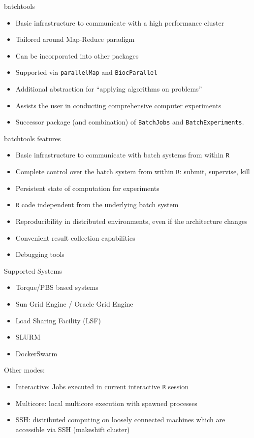\documentclass[11pt,compress,t,notes=noshow, aspectratio=169, xcolor=table]{beamer}
\begin{document}
\begin{frame}[fragile]{batchtools}
  \begin{itemize}
    \item Basic infrastructure to communicate with a high performance cluster
    \item Tailored around Map-Reduce paradigm
    \item Can be incorporated into other packages
    \item Supported via \texttt{parallelMap} and \texttt{BiocParallel}
    \item Additional abstraction for \enquote{applying algorithms on problems}
    \item Assists the user in conducting comprehensive computer experiments
    \item Successor package (and combination) of \texttt{BatchJobs} and \texttt{BatchExperiments}.
  \end{itemize}
\end{frame}

\begin{frame}[fragile]{batchtools features}
  \begin{itemize}
    \item Basic infrastructure to communicate with batch systems from within \texttt{R}
    \item Complete control over the batch system from within \texttt{R}: submit, supervise, kill
    \item Persistent state of computation for experiments
    \item \texttt{R} code independent from the underlying batch system
    \item Reproducibility in distributed environments, even if the architecture changes
    \item Convenient result collection capabilities
    \item Debugging tools
  \end{itemize}
\end{frame}

\begin{frame}[fragile]{Supported Systems}
  \begin{itemize}
    \item Torque/PBS based systems
    \item Sun Grid Engine / Oracle Grid Engine
    \item Load Sharing Facility (LSF)
    \item SLURM
    \item DockerSwarm
  \end{itemize}
  Other modes:
  \begin{itemize}
    \item Interactive: Jobs executed in current interactive \texttt{R} session
    \item Multicore: local multicore execution with spawned processes
    \item SSH: distributed computing on loosely connected machines which are accessible via SSH (makeshift cluster)
  \end{itemize}
\end{frame}
\end{document}
